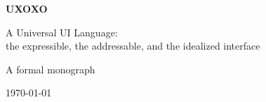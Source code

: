 \documentclass[11pt,oneside]{report}
\begin{document}
\begin{center}
\vspace*{3cm}
{\Huge\bfseries UXOXO\par}
\vspace{6mm}
{\Large A Universal UI Language:\\[2pt] the expressible, the addressable, and the idealized interface\par}
\vspace{2.2cm}
{\large A formal monograph\par}
\vspace{4mm}
{\color{cInk!70}\today\par}
\end{center}
\clearpage

\tableofcontents
\clearpage
{}



\end{document}
